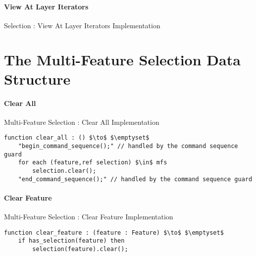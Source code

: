 \paragraph{View At Layer Iterators}

\begin{stulisting}[H]
\caption{Selection : View At Layer Iterators Implementation}

\end{stulisting}

\newpage

\section{The Multi-Feature Selection Data Structure}

\paragraph{Clear All}

\begin{stulisting}[H]
\caption{Multi-Feature Selection : Clear All Implementation}
\begin{lstlisting}[style=Default]
function clear_all : () $\to$ $\emptyset$
	"begin_command_sequence();" // handled by the command sequence guard
	for each (feature,ref selection) $\in$ mfs
		selection.clear();
	"end_command_sequence();" // handled by the command sequence guard
\end{lstlisting}
\end{stulisting}

\paragraph{Clear Feature}

\begin{stulisting}[H]
\caption{Multi-Feature Selection : Clear Feature Implementation}
\begin{lstlisting}[style=Default]
function clear_feature : (feature : Feature) $\to$ $\emptyset$
	if has_selection(feature) then
		selection(feature).clear();
\end{lstlisting}
\end{stulisting}

